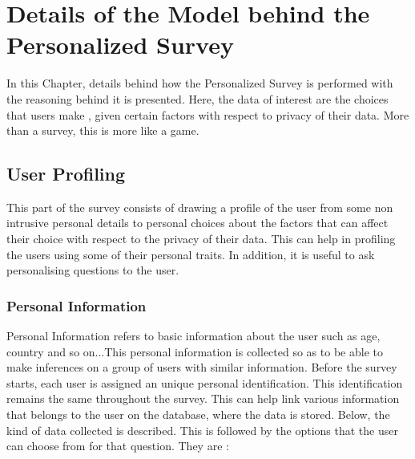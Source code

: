 \chapter{Details of the Model behind the Personalized Survey}

In this Chapter, details behind how the Personalized Survey is performed with the
reasoning behind it is presented. Here, the data of interest are the choices that users make
, given certain factors with respect to privacy of their data. More than a survey, this is more like a game.

\section{User Profiling}

This part of the survey consists of drawing a profile of the user from some non intrusive
personal details to personal choices about the factors that can affect their choice with respect to the privacy of their data.
This can help in profiling the users using some of their personal traits. In addition, it is useful to ask personalising questions
to the user.



\subsection{Personal Information}

Personal Information refers to basic information about the user such as age, country and so on...This personal information is collected 
so as to be able to make inferences on a group of users with similar information. Before the survey starts, each user
is assigned an unique personal identification. This identification remains the same throughout the survey. This can help link various information that belongs to the user
on the database, where the data is stored. Below, the kind of data collected is described. This is followed by the options that the user can choose from for that question.
They are :

